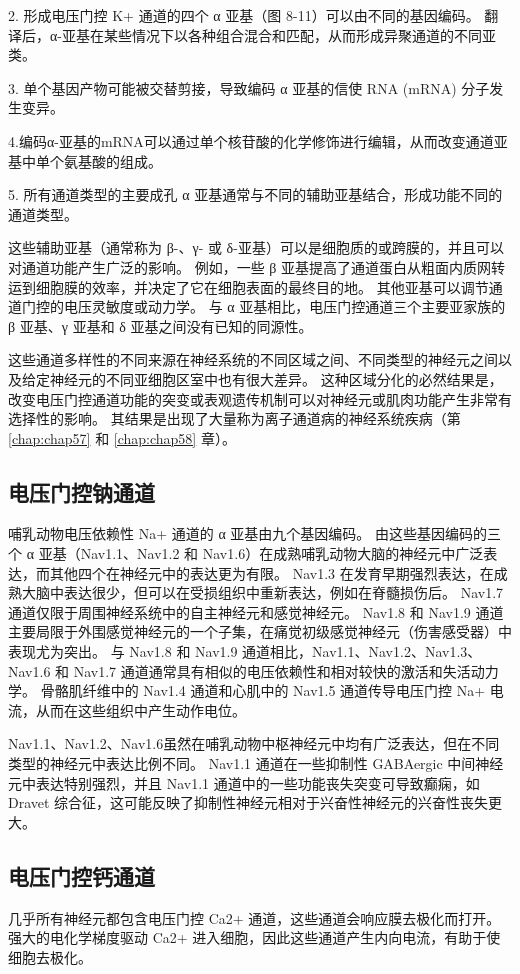 2. 形成电压门控 K+ 通道的四个 α 亚基（图 8-11）可以由不同的基因编码。 
翻译后，α-亚基在某些情况下以各种组合混合和匹配，从而形成异聚通道的不同亚类。 


3. 单个基因产物可能被交替剪接，导致编码 α 亚基的信使 RNA (mRNA) 分子发生变异。 


4.编码α-亚基的mRNA可以通过单个核苷酸的化学修饰进行编辑，从而改变通道亚基中单个氨基酸的组成。 


5. 所有通道类型的主要成孔 α 亚基通常与不同的辅助亚基结合，形成功能不同的通道类型。


这些辅助亚基（通常称为 β-、γ- 或 δ-亚基）可以是细胞质的或跨膜的，并且可以对通道功能产生广泛的影响。 
例如，一些 β 亚基提高了通道蛋白从粗面内质网转运到细胞膜的效率，并决定了它在细胞表面的最终目的地。 
其他亚基可以调节通道门控的电压灵敏度或动力学。 
与 α 亚基相比，电压门控通道三个主要亚家族的 β 亚基、γ 亚基和 δ 亚基之间没有已知的同源性。


这些通道多样性的不同来源在神经系统的不同区域之间、不同类型的神经元之间以及给定神经元的不同亚细胞区室中也有很大差异。 
这种区域分化的必然结果是，改变电压门控通道功能的突变或表观遗传机制可以对神经元或肌肉功能产生非常有选择性的影响。 
其结果是出现了大量称为离子通道病的神经系统疾病（第 \ref{chap:chap57} 和 \ref{chap:chap58} 章）。


\subsection{电压门控钠通道}
哺乳动物电压依赖性 Na+ 通道的 α 亚基由九个基因编码。 由这些基因编码的三个 α 亚基（Nav1.1、Nav1.2 和 Nav1.6）在成熟哺乳动物大脑的神经元中广泛表达，而其他四个在神经元中的表达更为有限。 Nav1.3 在发育早期强烈表达，在成熟大脑中表达很少，但可以在受损组织中重新表达，例如在脊髓损伤后。 Nav1.7 通道仅限于周围神经系统中的自主神经元和感觉神经元。 
Nav1.8 和 Nav1.9 通道主要局限于外围感觉神经元的一个子集，在痛觉初级感觉神经元（伤害感受器）中表现尤为突出。 
与 Nav1.8 和 Nav1.9 通道相比，Nav1.1、Nav1.2、Nav1.3、Nav1.6 和 Nav1.7 通道通常具有相似的电压依赖性和相对较快的激活和失活动力学。 
骨骼肌纤维中的 Nav1.4 通道和心肌中的 Nav1.5 通道传导电压门控 Na+ 电流，从而在这些组织中产生动作电位。


Nav1.1、Nav1.2、Nav1.6虽然在哺乳动物中枢神经元中均有广泛表达，但在不同类型的神经元中表达比例不同。 
Nav1.1 通道在一些抑制性 GABAergic 中间神经元中表达特别强烈，并且 Nav1.1 通道中的一些功能丧失突变可导致癫痫，如 Dravet 综合征，这可能反映了抑制性神经元相对于兴奋性神经元的兴奋性丧失更大。


\subsection{电压门控钙通道}
几乎所有神经元都包含电压门控 Ca2+ 通道，这些通道会响应膜去极化而打开。 
强大的电化学梯度驱动 Ca2+ 进入细胞，因此这些通道产生内向电流，有助于使细胞去极化。


